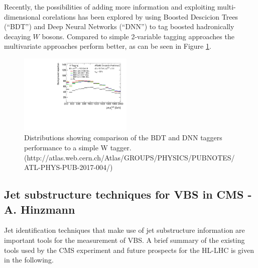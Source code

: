 Recently, the possibilities of adding more information and exploiting multi-dimensional corelations has been explored by using Boosted Descicion Trees (``BDT'') and Deep Neural Networks (``DNN'') to tag boosted hadronically decaying $W$ bosons. Compared to simple 2-variable tagging approaches the multivariate approaches perform better, as can be seen in Figure \ref{fig:MVA}.



\begin{figure}[!h]
\begin{centering}
\includegraphics[width=0.48\textwidth]{WG3_plots/fig_07c}
\caption{Distributions showing comparison of the BDT and DNN taggers performance to a simple W tagger. (http://atlas.web.cern.ch/Atlas/GROUPS/PHYSICS/PUBNOTES/ATL-PHYS-PUB-2017-004/)}
\label{fig:MVA}
\end{centering}
\end{figure}



\subsection{Jet substructure techniques for VBS in CMS -  A. Hinzmann}

Jet identification techniques that make use of jet substructure information are important tools for the measurement of VBS.
A brief summary of the existing tools used by the CMS experiment and future prospects for the HL-LHC is given in the following.

